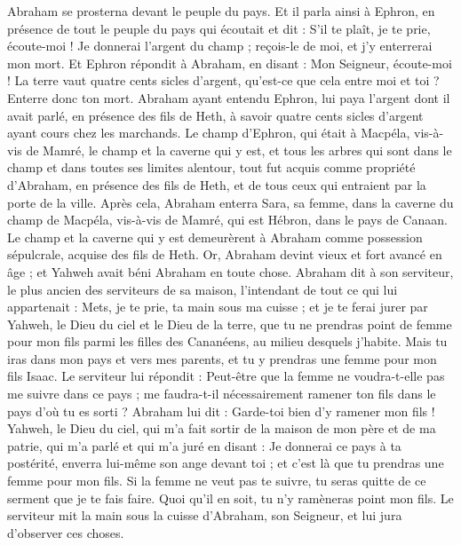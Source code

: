 \begin{multicols}{2}
Abraham se prosterna devant le peuple du pays.
Et il parla ainsi à Ephron, en présence de tout le peuple du pays qui écoutait et dit : S'il te plaît, je te prie, écoute-moi ! Je donnerai l'argent du champ ; reçois-le de moi, et j'y enterrerai mon mort.
Et Ephron répondit à Abraham, en disant :
Mon Seigneur, écoute-moi ! La terre vaut quatre cents sicles d'argent, qu’est-ce que cela entre moi et toi ? Enterre donc ton mort.
Abraham ayant entendu Ephron, lui paya l'argent dont il avait parlé, en présence des fils de Heth, à savoir quatre cents sicles d'argent ayant cours chez les marchands.
Le champ d'Ephron, qui était à Macpéla, vis-à-vis de Mamré, le champ et la caverne qui y est, et tous les arbres qui sont dans le champ et dans toutes ses limites alentour,
tout fut acquis comme propriété d’Abraham, en présence des fils de Heth, et de tous ceux qui entraient par la porte de la ville.
Après cela, Abraham enterra Sara, sa femme, dans la caverne du champ de Macpéla, vis-à-vis de Mamré, qui est Hébron, dans le pays de Canaan.
Le champ et la caverne qui y est demeurèrent à Abraham comme possession sépulcrale, acquise des fils de Heth.
\VerseOne{}Or, Abraham devint vieux et fort avancé en âge ; et Yahweh avait béni Abraham en toute chose.
Abraham dit à son serviteur, le plus ancien des serviteurs de sa maison, l’intendant de tout ce qui lui appartenait : Mets, je te prie, ta main sous ma cuisse ;
et je te ferai jurer par Yahweh, le Dieu du ciel et le Dieu de la terre, que tu ne prendras point de femme pour mon fils parmi les filles des Cananéens, au milieu desquels j'habite.
Mais tu iras dans mon pays et vers mes parents, et tu y prendras une femme pour mon fils Isaac.
Le serviteur lui répondit : Peut-être que la femme ne voudra-t-elle pas me suivre dans ce pays ; me faudra-t-il nécessairement ramener ton fils dans le pays d'où tu es sorti ?
Abraham lui dit : Garde-toi bien d'y ramener mon fils !
Yahweh, le Dieu du ciel, qui m'a fait sortir de la maison de mon père et de ma patrie, qui m'a parlé et qui m’a juré en disant : Je donnerai ce pays à ta postérité, enverra lui-même son ange devant toi ; et c’est là que tu prendras une femme pour mon fils.
Si la femme ne veut pas te suivre, tu seras quitte de ce serment que je te fais faire. Quoi qu'il en soit, tu n’y ramèneras point mon fils.
Le serviteur mit la main sous la cuisse d'Abraham, son Seigneur, et lui jura d’observer ces choses.

\end{multicols}
